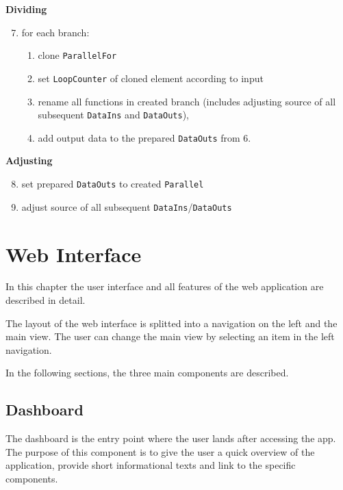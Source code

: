 \documentclass[a4paper,top=25mm,bottom=25mm,12pt,pdftex,halfparskip,twoside,bibtotoc,numbers=noenddot]{scrbook}
\begin{document}
\textbf{Dividing}
\begin{enumerate}
\setcounter{enumi}{6}
\item for each branch:
\begin{enumerate}
\item clone \texttt{ParallelFor}
\item set \texttt{LoopCounter} of cloned element according to input
\item rename all functions in created branch (includes adjusting source of all subsequent \texttt{DataIns} and \texttt{DataOuts}), 
\item add output data to the prepared \texttt{DataOuts} from 6.
\end{enumerate}
\end{enumerate}

\textbf{Adjusting}
\begin{enumerate}
\setcounter{enumi}{7}
\item set prepared \texttt{DataOuts} to created \texttt{Parallel}
\item adjust source of all subsequent \texttt{DataIns}/\texttt{DataOuts}
\end{enumerate}

\chapter{Web Interface}
\label{chap:impl-webinterface}

In this chapter the user interface and all features of the web application are described in detail.

The layout of the web interface is splitted into a navigation on the left and the main view. The user can change the main view by selecting an item in the left navigation.

In the following sections, the three main components are described.

\section{Dashboard}

The dashboard is the entry point where the user lands after accessing the app. The purpose of this component is to give the user a quick overview of the application, provide short informational texts and link to the specific components. 
\end{document}
